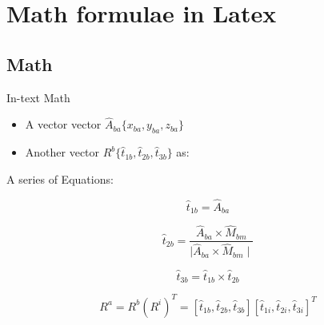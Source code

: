 
\chapter{Math formulae in Latex} %



\ifpdf
    \graphicspath{{4_chapter4/figures/PNG/}{4_chapter4/figures/PDF/}{4_chapter4/figures/}}
\else
    \graphicspath{{4_chapter4/figures/EPS/}{4_chapter4/figures/}}
\fi



\section{Math}


In-text Math
\begin{itemize}
\item A vector vector $\hat{A}_{ba}\{x_{ba}, y_{ba}, z_{ba}\} $  
\item Another vector $R^{b}\{\hat{t}_{1b}, \hat{t}_{2b}, \hat{t}_{3b}\}$ as:
\end{itemize}


\vspace{5mm}
A series of Equations:

\begin{equation}\label{eq:T1b}
\hat{t}_{1b} = \hat{A}_{ba}
\end{equation} 


\begin{equation}\label{eq:T2b}
\hat{t}_{2b} = \frac{\hat{A}_{ba} \times \hat{M}_{bm}}{\mid \hat{A}_{ba} \times \hat{M}_{bm} \mid}
\end{equation}  


\begin{equation}\label{eq:T3b}
\hat{t}_{3b} = \hat{t}_{1b} \times \hat{t}_{2b}
\end{equation}  

 \begin{equation}\label{eq:Ra}
R^{a} = R^{b} (R^{i})^{T} = [\hat{t}_{1b}, \hat{t}_{2b}, \hat{t}_{3b}] [\hat{t}_{1i}, \hat{t}_{2i}, \hat{t}_{3i}]^{T}
\end{equation}  

\vspace{5mm}

